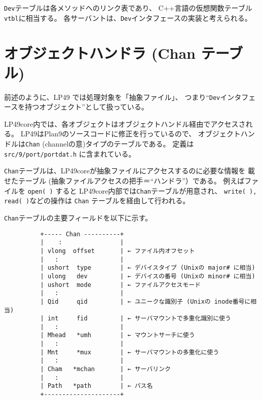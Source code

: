 {{\tt Dev}テーブルは各メソッドへのリンク表であり、
C++言語の仮想関数テーブル {\tt vtbl}に相当する。
各サーバントは、{\tt Dev}インタフェースの実装と考えられる。



\section{オブジェクトハンドラ (Chan テーブル)}

前述のように、LP49 では処理対象を「抽象ファイル」、
つまり``{\tt Dev}インタフェースを持つオブジェクト''として扱っている。

LP49core内では、各オブジェクトはオブジェクトハンドル経由でアクセスされる。
LP49はPlan9のソースコードに修正を行っているので、
オブジェクトハンドルは{\tt Chan} (channelの意)タイプのテーブルである。
定義は{\tt  src/9/port/portdat.h} に含まれている。

{\tt Chan}テーブルは、LP49coreが抽象ファイルにアクセスするのに必要な情報を
載せたテーブル (抽象ファイルアクセスの把手＝``ハンドラ''）である。
 例えばファイルを {\tt open( )} すると LP49core内部では{\tt Chan}テーブルが用意され、
{\tt write( ), read( )}などの操作は {\tt Chan} テーブルを経由して行われる。

  {\tt Chan}テーブルの主要フィールドを以下に示す。

{\small
\begin{verbatim}
          +----- Chan ----------+                                 
          |    :                |                         
          | vlong  offset       | ← ファイル内オフセット
          |   :                 |                         
          | ushort  type        | ← デバイスタイプ (Unixの major# に相当)
          | ulong   dev         | ← デバイスの番号 (Unixの minor# に相当)
          | ushort  mode        | ← ファイルアクセスモード
          |   :                 |                       
          | Qid     qid         | ← ユニークな識別子 (Unixの inode番号に相当)
          | int     fid         | ← サーバマウントで多重化識別に使う
          |   :                 |
          | Mhead   *umh        | ← マウントサーチに使う                     
          |   :                 | 
          | Mnt     *mux        | ← サーバマウントの多重化に使う
          |   :                 | 
          | Cham   *mchan       | ← サーバリンク
          |   :                 |                                            
          | Path   *path        | ← パス名
          +---------------------+                                                      
\end{verbatim}
}


}

